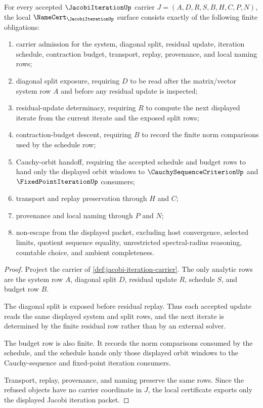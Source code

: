 \begin{theorem}
\label{thm:jacobi-iteration-namecert-obligations}
For every accepted $\JacobiIterationUp$ carrier $J=(A,D,R,S,B,H,C,P,N)$, the local $\NameCert_{\JacobiIterationUp}$ surface consists exactly of the following finite obligations:
\begin{enumerate}
\item carrier admission for the system, diagonal split, residual update, iteration schedule, contraction budget, transport, replay, provenance, and local naming rows;
\item diagonal split exposure, requiring $D$ to be read after the matrix/vector system row $A$ and before any residual update is inspected;
\item residual-update determinacy, requiring $R$ to compute the next displayed iterate from the current iterate and the exposed split rows;
\item contraction-budget descent, requiring $B$ to record the finite norm comparisons used by the schedule row;
\item Cauchy-orbit handoff, requiring the accepted schedule and budget rows to hand only the displayed orbit windows to $\CauchySequenceCriterionUp$ and $\FixedPointIterationUp$ consumers;
\item transport and replay preservation through $H$ and $C$;
\item provenance and local naming through $P$ and $N$;
\item non-escape from the displayed packet, excluding host convergence, selected limits, quotient sequence equality, unrestricted spectral-radius reasoning, countable choice, and ambient completeness.
\end{enumerate}
\end{theorem}
\begin{proof}
Project the carrier of \autoref{def:jacobi-iteration-carrier}. The only analytic rows are the system row $A$, diagonal split $D$, residual update $R$, schedule $S$, and budget row $B$.

The diagonal split is exposed before residual replay. Thus each accepted update reads the same displayed system and split rows, and the next iterate is determined by the finite residual row rather than by an external solver.

The budget row is also finite. It records the norm comparisons consumed by the schedule, and the schedule hands only those displayed orbit windows to the Cauchy-sequence and fixed-point iteration consumers.

Transport, replay, provenance, and naming preserve the same rows. Since the refused objects have no carrier coordinate in $J$, the local certificate exports only the displayed Jacobi iteration packet.
\end{proof}

